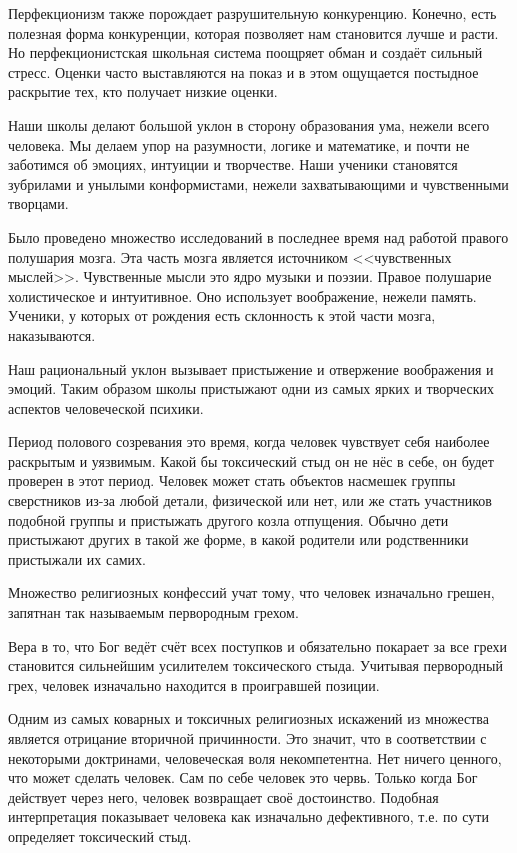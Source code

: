 \documentclass[10pt, fleqn]{article}
\begin{document}
Перфекционизм также порождает разрушительную конкуренцию. Конечно, есть полезная форма конкуренции, которая позволяет нам становится лучше и расти. Но перфекционистская школьная система поощряет обман и создаёт сильный стресс. Оценки часто выставляются на показ и в этом ощущается постыдное раскрытие тех, кто получает низкие оценки.


Наши школы делают большой уклон в сторону образования ума, нежели всего человека. Мы делаем упор на разумности, логике и математике, и почти не заботимся об эмоциях, интуиции и творчестве. Наши ученики становятся зубрилами и унылыми конформистами, нежели захватывающими и чувственными творцами.

Было проведено множество исследований в последнее время над работой правого полушария мозга. Эта часть мозга является источником <<чувственных мыслей>>. Чувственные мысли это ядро музыки и поэзии. Правое полушарие холистическое и интуитивное. Оно использует воображение, нежели память. Ученики, у которых от рождения есть склонность к этой части мозга, наказываются.

Наш рациональный уклон вызывает пристыжение и отвержение воображения и эмоций. Таким образом школы пристыжают одни из самых ярких и творческих аспектов человеческой психики.


Период полового созревания это время, когда человек чувствует себя наиболее раскрытым и уязвимым. Какой бы токсический стыд он не нёс в себе, он будет проверен в этот период. Человек может стать объектов насмешек группы сверстников из-за любой детали, физической или нет, или же стать участников подобной группы и пристыжать другого козла отпущения. Обычно дети пристыжают других в такой же форме, в какой родители или родственники пристыжали их самих.


Множество религиозных конфессий учат тому, что человек изначально грешен, запятнан так называемым первородным грехом.


Вера в то, что Бог ведёт счёт всех поступков и обязательно покарает за все грехи становится сильнейшим усилителем токсического стыда. Учитывая первородный грех, человек изначально находится в проигравшей позиции.


Одним из самых коварных и токсичных религиозных искажений из множества является отрицание вторичной причинности. Это значит, что в соответствии с некоторыми доктринами, человеческая воля некомпетентна. Нет ничего ценного, что может сделать человек. Сам по себе человек это червь. Только когда Бог действует через него, человек возвращает своё достоинство. Подобная интерпретация показывает человека как изначально дефективного, т.е. по сути определяет токсический стыд.
\end{document}
